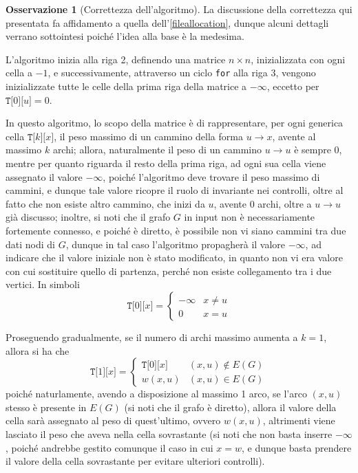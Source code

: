 \documentclass[14pt]{extreport}
\theoremstyle{definition}
\theoremstyle{definition}
\newtheorem{remark}{Osservazione}[subsection]
\begin{document}
\begin{remark}[Correttezza dell'algoritmo]
    La discussione della correttezza qui presentata fa affidamento a quella dell'\cref{fileallocation}, dunque alcuni dettagli verrano sottointesi poiché l'idea alla base è la medesima.

    L'algoritmo inizia alla riga 2, definendo una matrice $n \times n$, inizializzata con ogni cella a $-1$, e successivamente, attraverso un ciclo \texttt{for} alla riga 3, vengono inizializzate tutte le celle della prima riga della matrice a $- \infty$, eccetto per $\texttt{T[}0\texttt{][}u\texttt{]}=0$.

    In questo algoritmo, lo scopo della matrice è di rappresentare, per ogni generica cella $\texttt{T[}k\texttt{][}x\texttt{]}$, il peso massimo di un cammino della forma $u \rightarrow x$, avente al massimo $k$ archi; allora, naturalmente il peso di un cammino $u \rightarrow u$ è sempre 0, mentre per quanto riguarda il resto della prima riga, ad ogni sua cella viene assegnato il valore $- \infty$, poiché l'algoritmo deve trovare il peso massimo di cammini, e dunque tale valore ricopre il ruolo di invariante nei controlli, oltre al fatto che non esiste altro cammino, che inizi da $u$, avente 0 archi, oltre a $u \rightarrow u$ già discusso; inoltre, si noti che il grafo $G$ in input non è necessariamente fortemente connesso, e poiché è diretto, è possibile non vi siano cammini tra due dati nodi di $G$, dunque in tal caso l'algoritmo propagherà il valore $- \infty$, ad indicare che il valore iniziale non è stato modificato, in quanto non vi era valore con cui sostituire quello di partenza, perché non esiste collegamento tra i due vertici. In simboli $$\texttt{T[}0\texttt{][}x\texttt{]} = \left \{ \begin{array}{ll} - \infty & x \neq u \\ 0 & x = u \end{array} \right.$$

    Proseguendo gradualmente, se il numero di archi massimo aumenta a $k =1$, allora si ha che $$\texttt{T[}1\texttt{][}x\texttt{]} = \left \{ \begin{array}{ll} \texttt{T[}0\texttt{][}x\texttt{]} & (x, u) \notin E(G) \\ w(x, u) & (x, u) \in E(G) \end{array} \right .$$ poiché naturlamente, avendo a disposizione al massimo 1 arco, se l'arco $(x, u)$ stesso è presente in $E(G)$ (si noti che il grafo è diretto), allora il valore della cella sarà assegnato al peso di quest'ultimo, ovvero $w(x, u)$, altrimenti viene lasciato il peso che aveva nella cella sovrastante (si noti che non basta inserre $- \infty$, poiché andrebbe gestito comunque il caso in cui $x = w$, e dunque basta prendere il valore della cella sovrastante per evitare ulteriori controlli).


\end{remark}
\end{document}
